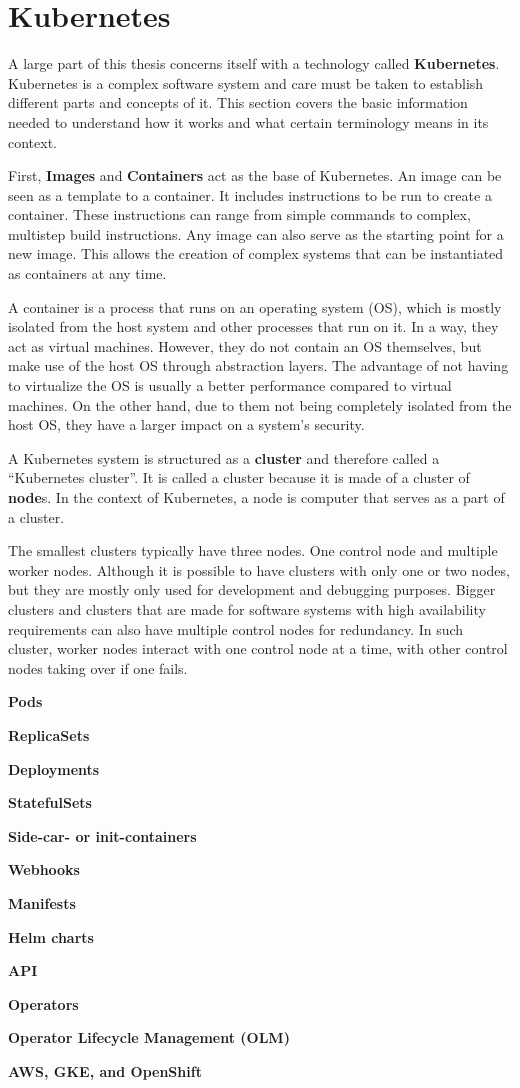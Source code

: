 \section{Kubernetes}\label{sec:kubernetes}

A large part of this thesis concerns itself with a technology called \textbf{Kubernetes}.
Kubernetes is a complex software system and care must be taken to establish different parts and concepts of it.
This section covers the basic information needed to understand how it works and what certain terminology means in its context.

First, \textbf{Images} and \textbf{Containers}\cite{docker-image} act as the base of Kubernetes.
An image can be seen as a template to a container.
It includes instructions to be run to create a container.
These instructions can range from simple commands to complex, multistep build instructions.
Any image can also serve as the starting point for a new image.
This allows the creation of complex systems that can be instantiated as containers at any time.

A container\cite{what-are-linux-containers} is a process that runs on an operating system (OS), which is mostly isolated from the host system and other processes that run on it.
In a way, they act as virtual machines.
However, they do not contain an OS themselves, but make use of the host OS through abstraction layers.
The advantage of not having to virtualize the OS is usually a better performance compared to virtual machines.
On the other hand, due to them not being completely isolated from the host OS, they have a larger impact on a system's security.

A Kubernetes system is structured as a \textbf{cluster} and therefore called a ``Kubernetes cluster''.
It is called a cluster because it is made of a cluster of \textbf{node}s.
In the context of Kubernetes, a node is computer that serves as a part of a cluster.

The smallest clusters typically have three nodes.
One control node and multiple worker nodes.
Although it is possible to have clusters with only one or two nodes, but they are mostly only used for development and debugging purposes.
Bigger clusters and clusters that are made for software systems with high availability requirements can also have multiple control nodes for redundancy.
In such cluster, worker nodes interact with one control node at a time, with other control nodes taking over if one fails.

\textbf{Pods}

\textbf{ReplicaSets}

\textbf{Deployments}

\textbf{StatefulSets}

\textbf{Side-car- or init-containers}

\textbf{Webhooks}

\textbf{Manifests}

\textbf{Helm charts}

\textbf{API}

\textbf{Operators}

\textbf{Operator Lifecycle Management (OLM)}

\textbf{AWS, GKE, and OpenShift}